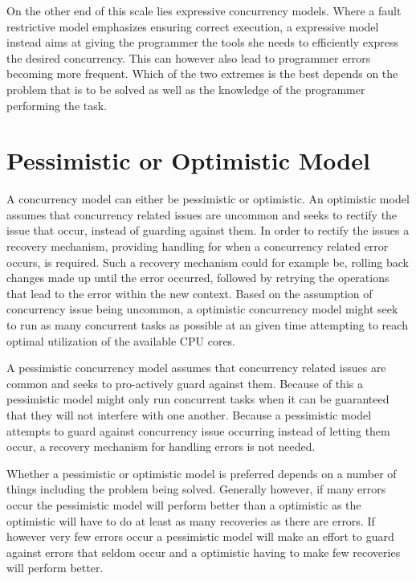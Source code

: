 On the other end of this scale lies expressive concurrency models. Where a fault restrictive model emphasizes ensuring correct execution, a expressive model instead aims at giving the programmer the tools she needs to efficiently express the desired concurrency. This can however also lead to programmer errors becoming more frequent. Which of the two extremes is the best depends on the problem that is to be solved as well as the knowledge of the programmer performing the task.
 
\section{Pessimistic or Optimistic Model}
A concurrency model can either be pessimistic or optimistic. An optimistic model assumes that concurrency related issues are uncommon and seeks to rectify the issue that occur, instead of guarding against them\cite[170]{weikum2001transactional}. In order to rectify the issues a recovery mechanism, providing handling for when a concurrency related error occurs, is required. Such a recovery mechanism could for example be, rolling back changes made up until the error occurred, followed by retrying the operations that lead to the error within the new context. Based on the assumption of concurrency issue being uncommon, a optimistic concurrency model might seek to run as many concurrent tasks as possible at an given time attempting to reach optimal utilization of the available \ac{CPU} cores. 

A pessimistic concurrency model assumes that concurrency related issues are common and seeks to pro-actively guard against them\cite[170]{weikum2001transactional}. Because of this a pessimistic model might only run concurrent tasks when it can be guaranteed that they will not interfere with one another. Because a pessimistic model attempts to guard against concurrency issue occurring instead of letting them occur, a recovery mechanism for handling errors is not needed.

Whether a pessimistic or optimistic model is preferred depends on a number of things including the problem being solved. Generally however, if many errors occur the pessimistic model will perform better than a optimistic as the optimistic will have to do at least as many recoveries as there are errors. If however very few errors occur a pessimistic model will make an effort to guard against errors that seldom occur and a optimistic having to make few recoveries will perform better.

